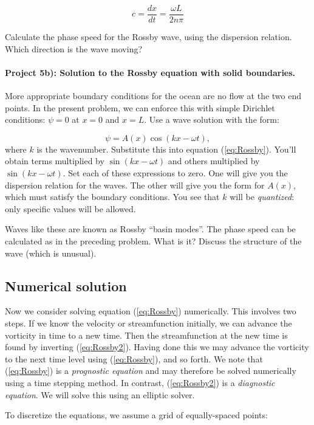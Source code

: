 \documentclass[%
oneside,                 %
final,                   %
10pt]{article}
\begin{document}
\begin{equation}
	c = \frac{dx}{dt} = \frac{\omega L}{2n\pi}
\end{equation}

Calculate the phase speed for the Rossby wave, using the dispersion relation. Which direction is the wave moving?


\paragraph{Project 5b): Solution to the Rossby equation with solid boundaries.}
More appropriate boundary conditions for the ocean are no flow at the
two end points. In the present problem, we can enforce this with
simple Dirichlet conditions: $\psi=0$ at $x=0$ and $x=L$. Use
a wave solution with the form:

\begin{equation}
	\psi = A(x)\cos{(kx - \omega t)}, 
\end{equation}
where $k$ is the wavenumber. Substitute this into equation
(\ref{eq:Rossby}). You'll obtain terms multiplied by $\sin{(kx - \omega
t)}$ and others multiplied by $\sin{(kx - \omega t)}$. Set each of these
expressions to zero. One will give you the dispersion relation for the
waves. The other will give you the form for $A(x)$, which must satisfy
the boundary conditions. You see that $k$ will be \emph{quantized}:
only specific values will be allowed.

Waves like these are known as Rossby ``basin modes''. The phase speed
can be calculated as in the preceding problem. What is it? Discuss the
structure of the wave (which is unusual).


\subsection{Numerical solution}
Now we consider solving equation (\ref{eq:Rossby}) numerically. This
involves two steps. If we know the velocity or streamfunction
initially, we can advance the vorticity in time to a new time. Then
the streamfunction at the new time is found by inverting
(\ref{eq:Rossby2}). Having done this we may advance the vorticity to
the next time level using (\ref{eq:Rossby}), and so forth. We note
that (\ref{eq:Rossby}) is a \emph{prognostic equation} and may
therefore be solved numerically using a time stepping method. In
contrast, (\ref{eq:Rossby2}) is a \emph{diagnostic equation}. We will
solve this using an elliptic solver.

To discretize the equations, we assume a grid of equally-spaced
points:
\end{document}
